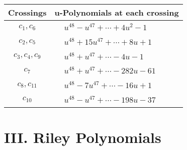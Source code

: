 \documentclass[1p]{elsarticle_modified}
\theoremstyle{definition}
\begin{document}
\begin{tabular}{m{50pt}|m{274pt}}
Crossings & \hspace{64pt}u-Polynomials at each crossing \\
\hline $$\begin{aligned}c_{1},c_{6}\end{aligned}$$&$\begin{aligned}
&u^{48}- u^{47}+\cdots+4 u^2-1
\end{aligned}$\\
\hline $$\begin{aligned}c_{2},c_{5}\end{aligned}$$&$\begin{aligned}
&u^{48}+15 u^{47}+\cdots+8 u+1
\end{aligned}$\\
\hline $$\begin{aligned}c_{3},c_{4},c_{9}\end{aligned}$$&$\begin{aligned}
&u^{48}+u^{47}+\cdots-4 u-1
\end{aligned}$\\
\hline $$\begin{aligned}c_{7}\end{aligned}$$&$\begin{aligned}
&u^{48}+u^{47}+\cdots-282 u-61
\end{aligned}$\\
\hline $$\begin{aligned}c_{8},c_{11}\end{aligned}$$&$\begin{aligned}
&u^{48}-7 u^{47}+\cdots-16 u+1
\end{aligned}$\\
\hline $$\begin{aligned}c_{10}\end{aligned}$$&$\begin{aligned}
&u^{48}- u^{47}+\cdots-198 u-37
\end{aligned}$\\
\hline
\end{tabular}\newpage\renewcommand{\arraystretch}{1}
\centering \section*{ III. Riley Polynomials}
\end{document}

